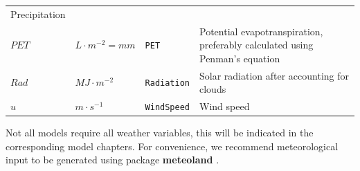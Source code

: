 \documentclass[]{book}
\begin{document}
\begin{longtable}[]{@{}llll@{}}
\begin{minipage}[t]{0.45\columnwidth}
Precipitation\strut
\end{minipage}\tabularnewline
\begin{minipage}[t]{0.11\columnwidth}\raggedright\strut
\(PET\)\strut
\end{minipage} & \begin{minipage}[t]{0.10\columnwidth}\raggedright\strut
\(L \cdot m^{-2} = mm\)\strut
\end{minipage} & \begin{minipage}[t]{0.12\columnwidth}\raggedright\strut
\texttt{PET}\strut
\end{minipage} & \begin{minipage}[t]{0.45\columnwidth}\raggedright\strut
Potential evapotranspiration, preferably calculated using Penman's
equation\strut
\end{minipage}\tabularnewline
\begin{minipage}[t]{0.11\columnwidth}\raggedright\strut
\(Rad\)\strut
\end{minipage} & \begin{minipage}[t]{0.10\columnwidth}\raggedright\strut
\(MJ \cdot m^{-2}\)\strut
\end{minipage} & \begin{minipage}[t]{0.12\columnwidth}\raggedright\strut
\texttt{Radiation}\strut
\end{minipage} & \begin{minipage}[t]{0.45\columnwidth}\raggedright\strut
Solar radiation after accounting for clouds\strut
\end{minipage}\tabularnewline
\begin{minipage}[t]{0.11\columnwidth}\raggedright\strut
\(u\)\strut
\end{minipage} & \begin{minipage}[t]{0.10\columnwidth}\raggedright\strut
\(m \cdot s^{-1}\)\strut
\end{minipage} & \begin{minipage}[t]{0.12\columnwidth}\raggedright\strut
\texttt{WindSpeed}\strut
\end{minipage} & \begin{minipage}[t]{0.45\columnwidth}\raggedright\strut
Wind speed\strut
\end{minipage}\tabularnewline
\bottomrule
\end{longtable}

Not all models require all weather variables, this will be indicated in
the corresponding model chapters. For convenience, we recommend
meteorological input to be generated using package \textbf{meteoland}
\citep{DeCaceres2018}.
\end{document}
